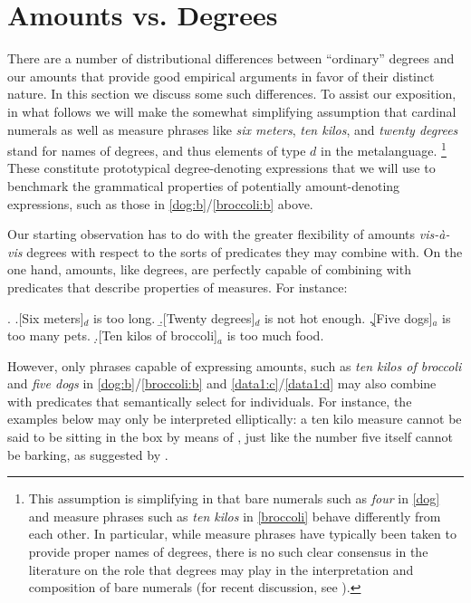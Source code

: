 \documentclass[a4paper,12pt,twoside]{article}
\begin{document}
	
	\section{Amounts vs. Degrees}\label{sec:data}
	
	There are a number of distributional differences between ``ordinary'' degrees and our amounts that provide good empirical arguments in favor of their distinct nature. In this section we discuss some such differences. To assist our exposition, in what follows we will make the somewhat simplifying assumption that cardinal numerals as well as measure phrases like \textit{six meters}, \textit{ten kilos}, and \textit{twenty degrees} stand for names of degrees, and thus elements of type $d$ in the metalanguage.%
	   \footnote{%
       This assumption is simplifying in that bare numerals such as \textit{four} in \ref{dog} and measure phrases such as \textit{ten kilos} in \ref{broccoli} behave differently from each other. In particular, while measure phrases have typically been taken to provide proper names of degrees, there is no such clear consensus in the literature on the role that degrees may play in the interpretation and composition of bare numerals (for recent discussion, see \citealt{Bylinina&Nouwen:2020}).
	} 
	These constitute prototypical degree-denoting expressions that we will use to benchmark the grammatical properties of potentially amount-denoting expressions, such as those in \ref{dog:b}/\ref{broccoli:b} above.
	
	Our starting observation has to do with the greater flexibility of amounts \textit{vis-à-vis} degrees with respect to the sorts of predicates they may combine with. On the one hand, amounts, like degrees, are perfectly capable of combining with predicates that describe properties of measures. For instance:
	
	\ex.\label{data1}
	\a.\label{data1:a}[Six meters]$_d$ is too long.
	\b.\label{data1:b}[Twenty degrees]$_d$ is not hot enough.
	\c.\label{data1:c}[Five dogs]$_a$ is too many pets.
	\d.\label{data1:d}[Ten kilos of broccoli]$_a$ is too much food.
	
	However, only phrases capable of expressing amounts, such as \textit{ten kilos of broccoli} and \textit{five dogs} in \ref{dog:b}/\ref{broccoli:b} and \ref{data1:c}/\ref{data1:d} may also combine with predicates that semantically select for individuals. For instance,  the examples below may only be interpreted elliptically: a ten kilo measure cannot be said to be sitting in the box by means of \Next[a], just like the number five itself cannot be barking, as suggested by \Next[b].
	
\end{document}
